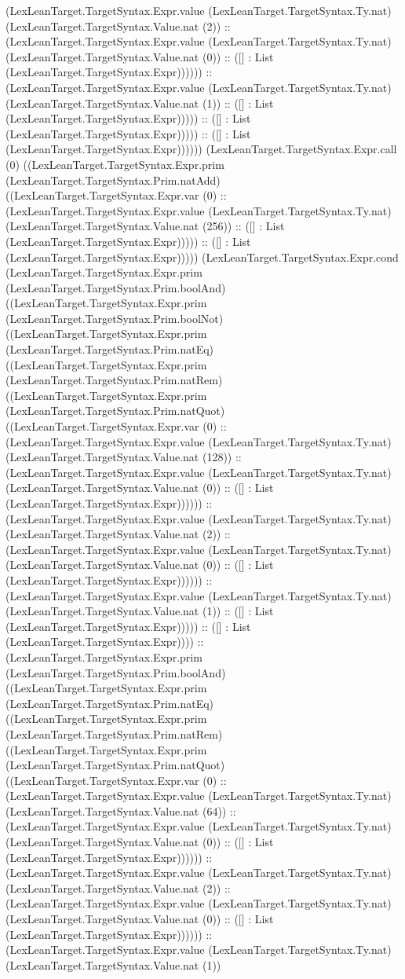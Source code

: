 \documentclass[11pt]{article}
\begin{document}
(LexLeanTarget.TargetSyntax.Expr.value (LexLeanTarget.TargetSyntax.Ty.nat) (LexLeanTarget.TargetSyntax.Value.nat (2)) :: (LexLeanTarget.TargetSyntax.Expr.value (LexLeanTarget.TargetSyntax.Ty.nat) (LexLeanTarget.TargetSyntax.Value.nat (0)) :: ([] : List (LexLeanTarget.TargetSyntax.Expr)))))) :: (LexLeanTarget.TargetSyntax.Expr.value (LexLeanTarget.TargetSyntax.Ty.nat) (LexLeanTarget.TargetSyntax.Value.nat (1)) :: ([] : List (LexLeanTarget.TargetSyntax.Expr))))) :: ([] : List (LexLeanTarget.TargetSyntax.Expr))))) :: ([] : List (LexLeanTarget.TargetSyntax.Expr)))))) (LexLeanTarget.TargetSyntax.Expr.call (0) ((LexLeanTarget.TargetSyntax.Expr.prim (LexLeanTarget.TargetSyntax.Prim.natAdd) ((LexLeanTarget.TargetSyntax.Expr.var (0) :: (LexLeanTarget.TargetSyntax.Expr.value (LexLeanTarget.TargetSyntax.Ty.nat) (LexLeanTarget.TargetSyntax.Value.nat (256)) :: ([] : List (LexLeanTarget.TargetSyntax.Expr))))) :: ([] : List (LexLeanTarget.TargetSyntax.Expr))))) (LexLeanTarget.TargetSyntax.Expr.cond (LexLeanTarget.TargetSyntax.Expr.prim (LexLeanTarget.TargetSyntax.Prim.boolAnd) ((LexLeanTarget.TargetSyntax.Expr.prim (LexLeanTarget.TargetSyntax.Prim.boolNot) ((LexLeanTarget.TargetSyntax.Expr.prim (LexLeanTarget.TargetSyntax.Prim.natEq) ((LexLeanTarget.TargetSyntax.Expr.prim (LexLeanTarget.TargetSyntax.Prim.natRem) ((LexLeanTarget.TargetSyntax.Expr.prim (LexLeanTarget.TargetSyntax.Prim.natQuot) ((LexLeanTarget.TargetSyntax.Expr.var (0) :: (LexLeanTarget.TargetSyntax.Expr.value (LexLeanTarget.TargetSyntax.Ty.nat) (LexLeanTarget.TargetSyntax.Value.nat (128)) :: (LexLeanTarget.TargetSyntax.Expr.value (LexLeanTarget.TargetSyntax.Ty.nat) (LexLeanTarget.TargetSyntax.Value.nat (0)) :: ([] : List (LexLeanTarget.TargetSyntax.Expr)))))) :: (LexLeanTarget.TargetSyntax.Expr.value (LexLeanTarget.TargetSyntax.Ty.nat) (LexLeanTarget.TargetSyntax.Value.nat (2)) :: (LexLeanTarget.TargetSyntax.Expr.value (LexLeanTarget.TargetSyntax.Ty.nat) (LexLeanTarget.TargetSyntax.Value.nat (0)) :: ([] : List (LexLeanTarget.TargetSyntax.Expr)))))) :: (LexLeanTarget.TargetSyntax.Expr.value (LexLeanTarget.TargetSyntax.Ty.nat) (LexLeanTarget.TargetSyntax.Value.nat (1)) :: ([] : List (LexLeanTarget.TargetSyntax.Expr))))) :: ([] : List (LexLeanTarget.TargetSyntax.Expr)))) :: (LexLeanTarget.TargetSyntax.Expr.prim (LexLeanTarget.TargetSyntax.Prim.boolAnd) ((LexLeanTarget.TargetSyntax.Expr.prim (LexLeanTarget.TargetSyntax.Prim.natEq) ((LexLeanTarget.TargetSyntax.Expr.prim (LexLeanTarget.TargetSyntax.Prim.natRem) ((LexLeanTarget.TargetSyntax.Expr.prim (LexLeanTarget.TargetSyntax.Prim.natQuot) ((LexLeanTarget.TargetSyntax.Expr.var (0) :: (LexLeanTarget.TargetSyntax.Expr.value (LexLeanTarget.TargetSyntax.Ty.nat) (LexLeanTarget.TargetSyntax.Value.nat (64)) :: (LexLeanTarget.TargetSyntax.Expr.value (LexLeanTarget.TargetSyntax.Ty.nat) (LexLeanTarget.TargetSyntax.Value.nat (0)) :: ([] : List (LexLeanTarget.TargetSyntax.Expr)))))) :: (LexLeanTarget.TargetSyntax.Expr.value (LexLeanTarget.TargetSyntax.Ty.nat) (LexLeanTarget.TargetSyntax.Value.nat (2)) :: (LexLeanTarget.TargetSyntax.Expr.value (LexLeanTarget.TargetSyntax.Ty.nat) (LexLeanTarget.TargetSyntax.Value.nat (0)) :: ([] : List (LexLeanTarget.TargetSyntax.Expr)))))) :: (LexLeanTarget.TargetSyntax.Expr.value (LexLeanTarget.TargetSyntax.Ty.nat) (LexLeanTarget.TargetSyntax.Value.nat (1)) 
\end{document}
